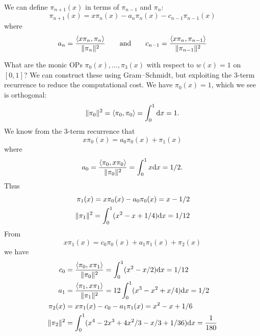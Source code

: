 \begin{corollary} We can define $\ensuremath{\pi}_{n+1}(x)$ in terms of $\ensuremath{\pi}_{n-1}$ and $\ensuremath{\pi}_n$:
\[
\ensuremath{\pi}_{n+1}(x) = x \ensuremath{\pi}_n(x) - a_n \ensuremath{\pi}_n(x) - c_{n-1} \ensuremath{\pi}_{n-1}(x)
\]
where
\[
a_n = {\ensuremath{\langle}x \ensuremath{\pi}_n, \ensuremath{\pi}_n\ensuremath{\rangle} \over \| \ensuremath{\pi}_n\|^2} \qquad \hbox{and} \qquad c_{n-1} = {\ensuremath{\langle}x \ensuremath{\pi}_n, \ensuremath{\pi}_{n-1}\ensuremath{\rangle} \over \| \ensuremath{\pi}_{n-1}\|^2}
\]
\begin{example} What are the  monic OPs $\ensuremath{\pi}_0(x),\ensuremath{\ldots},\ensuremath{\pi}_3(x)$ with respect to $w(x) = 1$ on $[0,1]$? We can construct these using Gram\ensuremath{\endash}Schmidt, but exploiting the 3-term recurrence to reduce the computational cost. We have $\ensuremath{\pi}_0(x) = 1$, which we see is orthogonal:
\[
\|\ensuremath{\pi}_0\|^2 = \ensuremath{\langle}\ensuremath{\pi}_0,\ensuremath{\pi}_0\ensuremath{\rangle} = \ensuremath{\int}_0^1 {\rm d} x = 1.
\]
We know from the 3-term recurrence that
\[
x \ensuremath{\pi}_0(x) = a_0 \ensuremath{\pi}_0(x) +  \ensuremath{\pi}_1(x)
\]
where
\[
a_0 = {\ensuremath{\langle}\ensuremath{\pi}_0,x \ensuremath{\pi}_0\ensuremath{\rangle}  \over \|\ensuremath{\pi}_0\|^2} = \ensuremath{\int}_0^1 x {\rm d} x = 1/2.
\]
Thus
\begin{align*}
\ensuremath{\pi}_1(x) = x \ensuremath{\pi}_0(x) - a_0 \ensuremath{\pi}_0(x) = x-1/2 \\
\|\ensuremath{\pi}_1\|^2 = \ensuremath{\int}_0^1 (x^2 - x + 1/4) {\rm d} x = 1/12
\end{align*}
From
\[
x \ensuremath{\pi}_1(x) = c_0 \ensuremath{\pi}_0(x) + a_1 \ensuremath{\pi}_1(x) +  \ensuremath{\pi}_2(x)
\]
we have
\begin{align*}
c_0 &= {\ensuremath{\langle}\ensuremath{\pi}_0,x \ensuremath{\pi}_1\ensuremath{\rangle}  \over \|\ensuremath{\pi}_0\|^2} = \ensuremath{\int}_0^1 (x^2 - x/2) {\rm d} x = 1/12 \\
a_1 &= {\ensuremath{\langle}\ensuremath{\pi}_1,x \ensuremath{\pi}_1\ensuremath{\rangle}  \over \|\ensuremath{\pi}_1\|^2} = 12 \ensuremath{\int}_0^1 (x^3 - x^2 + x/4) {\rm d} x = 1/2 \\
\ensuremath{\pi}_2(x) &= x \ensuremath{\pi}_1(x) - c_0 - a_1 \ensuremath{\pi}_1(x) = x^2 - x + 1/6 \\
\|\ensuremath{\pi}_2\|^2 &= \int_0^1 (x^4 - 2x^3 + 4x^2/3 - x/3 + 1/36) {\rm d} x = {1 \over 180}

\end{align*}
\end{example}
\end{corollary}
